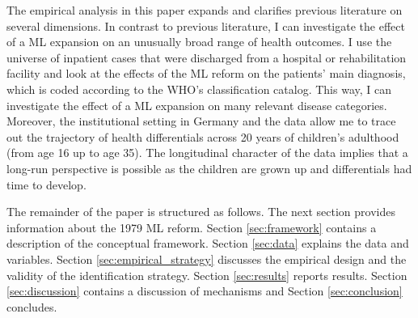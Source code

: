 \documentclass[11pt, a4paper, draft]{article} %
\begin{document}
The empirical analysis in this paper expands and clarifies previous literature on several dimensions. In contrast to previous literature, I can investigate the effect of a ML expansion on an unusually broad range of health outcomes. I use the universe of inpatient cases that were discharged from a hospital or rehabilitation facility and look at the effects of the ML reform on the patients' main diagnosis, which is coded according to the WHO's classification catalog. This way, I can investigate the effect of a ML expansion on many relevant disease categories. Moreover, the institutional setting in Germany and the data allow me to trace out the trajectory of health differentials across 20 years of children's adulthood (from age 16 up to age 35). The longitudinal character of the data implies that a long-run perspective is possible as the children are grown up and differentials had time to develop. 




The remainder of the paper is structured as follows. The next section provides information about the 1979 ML reform. Section \ref{sec:framework} contains a description of the conceptual framework. Section \ref{sec:data} explains the data and variables. Section \ref{sec:empirical_strategy} discusses the empirical design and the validity of the identification strategy. Section \ref{sec:results} reports results. Section \ref{sec:discussion} contains a discussion of mechanisms and Section \ref{sec:conclusion} concludes.


%
%
%
%
%
%
\end{document}
